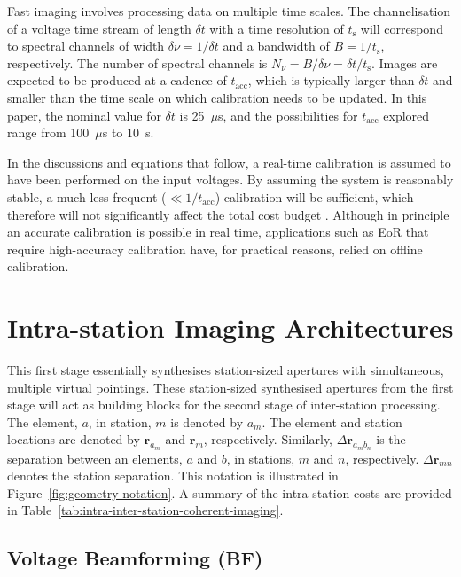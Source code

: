 \documentclass[
  journal=pasa,
  manuscript=article-type,
  year=2020,
  volume=37,
]{cup-journal}
\begin{document}
Fast imaging involves processing data on multiple time scales. The channelisation of a voltage time stream of length $\delta t$ with a time resolution of $t_\textrm{s}$ will correspond to spectral channels of width $\delta\nu=1/\delta t$ and a bandwidth of $B=1/t_\textrm{s}$, respectively. The number of spectral channels is $N_\nu=B/\delta\nu=\delta t/t_\textrm{s}$. Images are expected to be produced at a cadence of $t_\textrm{acc}$, which is typically larger than $\delta t$ and smaller than the time scale on which calibration needs to be updated. In this paper, the nominal value for $\delta t$ is 25~$\mu$s, and the possibilities for $t_\textrm{acc}$ explored range from 100~$\mu$s to 10~s. 

In the discussions and equations that follow, a real-time calibration is assumed to have been performed on the input voltages. By assuming the system is reasonably stable, a much less frequent ($\ll 1/t_\textrm{acc}$) calibration will be sufficient, which therefore will not significantly affect the total cost budget \citep{Beardsley+2017,Gorthi+2021}. Although in principle an accurate calibration is possible in real time, applications such as EoR that require high-accuracy calibration have, for practical reasons, relied on offline calibration.

\section{Intra-station Imaging Architectures} \label{sec:intra-station-arch}

This first stage essentially synthesises station-sized apertures with simultaneous, multiple virtual pointings. These station-sized synthesised apertures from the first stage will act as building blocks for the second stage of inter-station processing. The element, $a$, in station, $m$ is denoted by $a_m$. The element and station locations are denoted by $\boldsymbol{r}_{a_m}$ and $\boldsymbol{r}_m$, respectively. Similarly, $\Delta\boldsymbol{r}_{a_m b_n}$ is the separation between an elements, $a$ and $b$, in stations, $m$ and $n$, respectively. $\Delta\boldsymbol{r}_{mn}$ denotes the station separation. This notation is illustrated in Figure~\ref{fig:geometry-notation}. A summary of the intra-station costs are provided in Table~\ref{tab:intra-inter-station-coherent-imaging}. 

\subsection{Voltage Beamforming (BF)}
\end{document}
